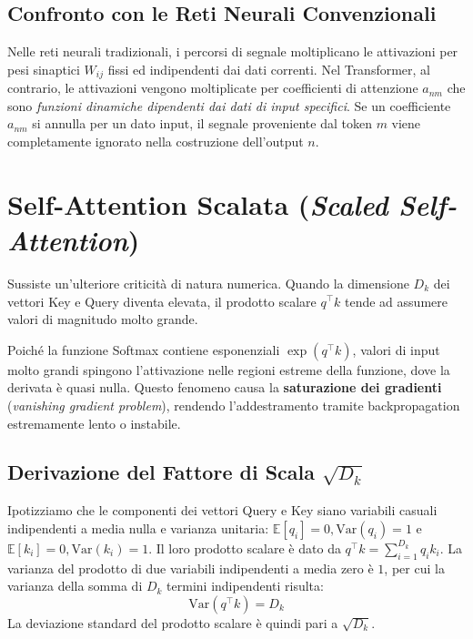 \newpage




\subsection{Confronto con le Reti Neurali Convenzionali}
Nelle reti neurali tradizionali, i percorsi di segnale moltiplicano le attivazioni per pesi sinaptici $W_{ij}$ fissi ed indipendenti dai dati correnti. Nel Transformer, al contrario, le attivazioni vengono moltiplicate per coefficienti di attenzione $a_{nm}$ che sono \emph{funzioni dinamiche dipendenti dai dati di input specifici}. Se un coefficiente $a_{nm}$ si annulla per un dato input, il segnale proveniente dal token $m$ viene completamente ignorato nella costruzione dell'output $n$.

\section{Self-Attention Scalata (\textit{Scaled Self-Attention})}
Sussiste un'ulteriore criticità di natura numerica. Quando la dimensione $D_k$ dei vettori Key e Query diventa elevata, il prodotto scalare $q^\top k$ tende ad assumere valori di magnitudo molto grande.

Poiché la funzione Softmax contiene esponenziali $\exp(q^\top k)$, valori di input molto grandi spingono l'attivazione nelle regioni estreme della funzione, dove la derivata è quasi nulla. Questo fenomeno causa la \textbf{saturazione dei gradienti} (\textit{vanishing gradient problem}), rendendo l'addestramento tramite backpropagation estremamente lento o instabile.

\subsection{Derivazione del Fattore di Scala $\sqrt{D_k}$}
Ipotizziamo che le componenti dei vettori Query e Key siano variabili casuali indipendenti a media nulla e varianza unitaria: $\mathbb{E}[q_i] = 0, \text{Var}(q_i) = 1$ e $\mathbb{E}[k_i] = 0, \text{Var}(k_i) = 1$.
Il loro prodotto scalare è dato da $q^\top k = \sum_{i=1}^{D_k} q_i k_i$. La varianza del prodotto di due variabili indipendenti a media zero è $1$, per cui la varianza della somma di $D_k$ termini indipendenti risulta:
\begin{equation}
\text{Var}\left(q^\top k\right) = D_k
\end{equation}
La deviazione standard del prodotto scalare è quindi pari a $\sqrt{D_k}$.

